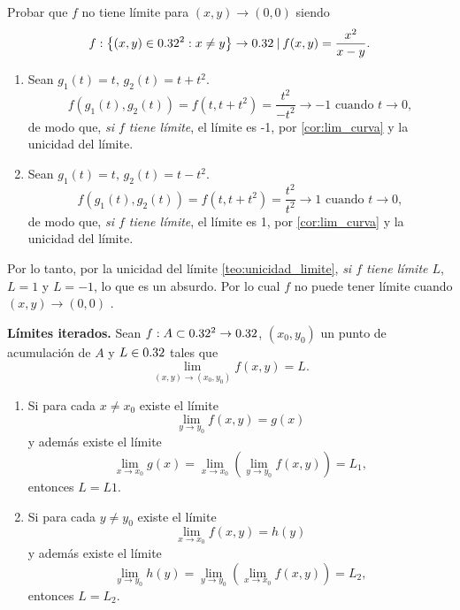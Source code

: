 \begin{example} Probar que $f$ no tiene l\'imite para $(x,y) \to (0,0)$ siendo $$ f: \left\lbrace (x,y) \in 0.32^2 : x \ne y \right\rbrace \to 0.32 \: |\:  f(x,y) = \frac{x^2}{x - y}.$$
   \begin{enumerate} 
   \item  Sean $g_1(t) = t, \,  g_2(t) = t + t^2$.
  \[
   f(g_1(t),g_2(t)) = f(t,t + t^2) = \frac{t^2}{-t^2} \to -1 \text{ cuando } t \to 0,
  \]
  de modo que, \emph{si $f$ tiene l\'imite}, el l\'imite es -1, por \eqref{cor:lim_curva} y la unicidad del l\'imite.
  \item  Sean $g_1(t) = t, \, g_2(t) = t - t^2$.
  \[
   f(g_1(t),g_2(t)) = f(t,t + t^2) = \frac{t^2}{t^2} \to 1 \text{ cuando } t \to 0,
  \]
  de modo que, \emph{si $f$ tiene l\'imite}, el l\'imite es 1, por \eqref{cor:lim_curva} y la unicidad del l\'imite.
  \end{enumerate}
  Por lo tanto, por la unicidad del l\'imite \eqref{teo:unicidad_limite}, \emph{si $f$ tiene l\'imite $L$}, $L = 1$ y $ L= -1$, lo que es un absurdo.  Por lo cual $f$ no puede tener l\'imite cuando  $(x,y) \to (0,0)$  .
\end{example}

\begin{propertie}\textbf{L\'imites iterados.} \label{prop:lim_ite}
  Sean $f: A \subset 0.32^2 \to 0.32$, $(x_0,y_0)$ un punto de acumulaci\'on de $A$ y $L \in 0.32$ tales que
  \[
   \lim_{(x,y) \to (x_0,y_0)} f(x,y) = L.
  \]
  \begin{enumerate} %
   \item Si para cada $x \ne x_0$ existe el l\'imite
  \[
   \lim_{y \to y_0} f(x,y) = g(x)
  \]
  y adem\'as existe el l\'imite
  \[
   \lim_{x \to x_0} g(x) = \lim_{x \to x_0} \left( \lim_{y \to y_0} f(x,y) \right) = L_1,
  \]  
  entonces $L = L1$.
  \item Si para cada $y \ne y_0$ existe el l\'imite
  \[
   \lim_{x \to x_0} f(x,y) = h(y)
  \]
  y adem\'as existe el l\'imite
  \[
   \lim_{y \to y_0} h(y) = \lim_{y \to y_0} \left( \lim_{x \to x_0} f(x,y) \right) = L_2, 
  \]
  entonces $L = L_2$.
  \end{enumerate}
\end{propertie}

